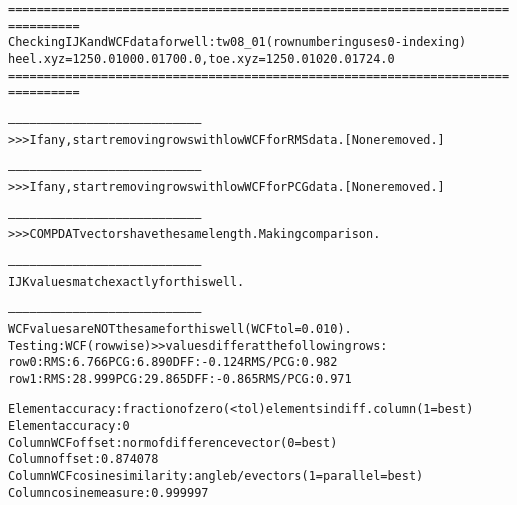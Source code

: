 \begin{alltt}
================================================================================
Checking IJK and WCF data for well: tw08_01 (row numbering uses 0-indexing)
heel.xyz = 1250.0 1000.0 1700.0, toe.xyz = 1250.0 1020.0 1724.0
================================================================================

--------------------------------------------------------------------------------
>>> If any, start removing rows with low WCF for RMS data. [None removed.]

--------------------------------------------------------------------------------
>>> If any, start removing rows with low WCF for PCG data. [None removed.]

--------------------------------------------------------------------------------
>>> COMPDAT vectors have the same length. Making comparison.

--------------------------------------------------------------------------------
IJK values match exactly for this well.

--------------------------------------------------------------------------------
WCF values are NOT the same for this well (WCF tol = 0.010).
Testing: WCF (rowwise) >> values differ at the following rows:
row   0:  RMS:   6.766    PCG:   6.890    DFF:  -0.124    RMS/PCG:   0.982    
row   1:  RMS:  28.999    PCG:  29.865    DFF:  -0.865    RMS/PCG:   0.971    

Element accuracy: fraction of zero (<tol) elements in diff. column (1=best)
Element accuracy:  0
Column WCF offset: norm of difference vector (0=best)
Column offset:  0.874078
Column WCF cosine similarity: angle b/e vectors (1=parallel=best)
Column cosine measure:  0.999997
\end{alltt}

